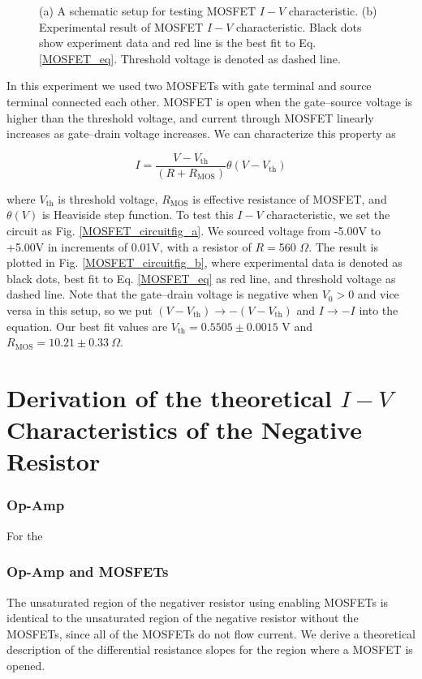 \documentclass[%
 aip,
amsmath,amssymb,
reprint,
]{revtex4-1}
\begin{document}
\begin{figure}[!htbp]
\caption{(a) A schematic setup for testing MOSFET $I-V$ characteristic. (b) Experimental result of MOSFET $I-V$ characteristic. Black dots show experiment data and red line is the best fit to Eq. \ref{MOSFET_eq}. Threshold voltage is denoted as dashed line.} \label{MOSFET_circuitfig}
\end{figure}

In this experiment we used two MOSFETs with gate terminal and source terminal connected each other.
MOSFET is open when the gate--source voltage is higher than the threshold voltage, and current through MOSFET linearly increases as gate--drain voltage increases.
We can characterize this property as 

\begin{equation}
I=\frac{V-V_{\textrm{th}}}{(R+R_{\textrm{MOS}})}\theta(V-V_{\textrm{th}})
\label{MOSFET_eq}
\end{equation}

\noindent where $V_{\textrm{th}}$ is threshold voltage, $R_{\textrm{MOS}}$ is effective resistance of MOSFET, and $\theta(V)$ is Heaviside step function.
To test this $I-V$ characteristic, we set the circuit as Fig. \ref{MOSFET_circuitfig_a}.
We sourced voltage from -5.00V to +5.00V in increments of 0.01V, with a resistor of $R=$560 $\Omega$.
The result is plotted in Fig. \ref{MOSFET_circuitfig_b}, where experimental data is denoted as black dots, best fit to Eq. \ref{MOSFET_eq} as red line, and threshold voltage as dashed line.
Note that the gate--drain voltage is negative when $V_{0}>0$ and vice versa in this setup, so we put $(V-V_{\textrm{th}})\rightarrow-(V-V_{\textrm{th}})$ and $I\rightarrow -I$ into the equation.
Our best fit values are $V_{\textrm{th}}=0.5505\pm0.0015$ V and $R_{\textrm{MOS}}=10.21\pm0.33\>\Omega$.


\section{Derivation of the theoretical $I-V$ Characteristics of the Negative Resistor}
\subsubsection{\label{opampiv}Op-Amp}
For the 

\subsubsection{\label{opamp_mosfetiv}Op-Amp and MOSFETs}
The unsaturated region of the negativer resistor using enabling MOSFETs is identical to the unsaturated region of the negative resistor without the MOSFETs, since all of the MOSFETs do not flow current. We derive a theoretical description of the differential resistance slopes for the region where a MOSFET is opened. 
\end{document}
